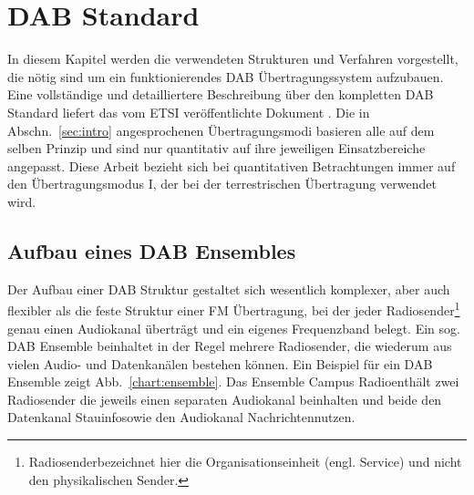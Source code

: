 \chapter{DAB Standard}
\label{sec:standard}
In diesem Kapitel werden die verwendeten Strukturen und Verfahren vorgestellt, die nötig sind um ein funktionierendes DAB Übertragungssystem aufzubauen. Eine vollständige und detailliertere Beschreibung über den kompletten DAB Standard liefert das vom \ac{ETSI} veröffentlichte Dokument \cite{etsi:dab_main}. Die in Abschn.~\ref{sec:intro} angesprochenen Übertragungsmodi basieren alle auf dem selben Prinzip und sind nur quantitativ auf ihre jeweiligen Einsatzbereiche angepasst. Diese Arbeit bezieht sich bei quantitativen Betrachtungen immer auf den Übertragungsmodus I, der bei der terrestrischen Übertragung verwendet wird.

\section{Aufbau eines DAB Ensembles}
Der Aufbau einer DAB Struktur gestaltet sich wesentlich komplexer, aber auch flexibler als die feste Struktur einer FM Übertragung, bei der jeder Radiosender\footnote{\dq Radiosender\dq bezeichnet hier die Organisationseinheit (engl. \dq Service\dq) und nicht den physikalischen Sender.} genau einen Audiokanal überträgt und ein eigenes Frequenzband belegt. Ein sog. DAB Ensemble beinhaltet in der Regel mehrere Radiosender, die wiederum aus vielen Audio- und Datenkanälen bestehen können. Ein Beispiel für ein DAB Ensemble zeigt Abb.~\ref{chart:ensemble}. Das Ensemble \dq Campus Radio\dq enthält zwei Radiosender die jeweils einen separaten Audiokanal beinhalten und beide den Datenkanal \dq Stauinfo\dq sowie den Audiokanal \dq Nachrichten\dq nutzen.\\

